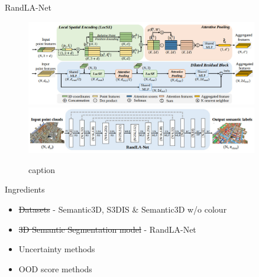 \documentclass[aspectratio=169]{beamer}
\begin{document}
\begin{frame}{RandLA-Net}
    \begin{figure}
        \centering
        \includegraphics[width = 0.9\textwidth, height=0.37\textheight]{images/randlanet_dires_block.jpg}
        \includegraphics[width = 0.9\textwidth, height=0.37\textheight]{images/randlanet_model.jpg}
        \caption{caption}
        \label{fig:randla_model}
    \end{figure}
\end{frame}
\begin{frame}{Ingredients}
    \begin{itemize}
        \item \st{Datasets} - Semantic3D, S3DIS \& Semantic3D w/o colour
        \item \st{3D Semantic Segmentation model} - RandLA-Net
        \item Uncertainty methods
        \item OOD score methods
    \end{itemize}
\end{frame}
\end{document}
